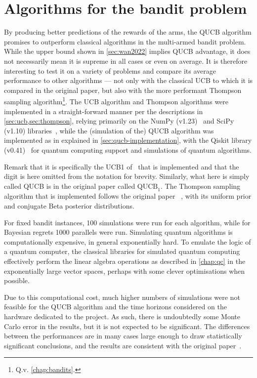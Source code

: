 \section{Algorithms for the bandit problem}
By producing better predictions of the rewards of the arms, the QUCB algorithm promises to outperform classical algorithms in the multi-armed bandit problem.
While the upper bound shown in \cref{sec:wan2022} implies QUCB advantage, it does not necessarily mean it is supreme in all cases or even on average.
It is therefore interesting to test it on a variety of problems and compare its average performance to other algorithms — not only with the classical UCB to which it is compared in the original paper, but also with the more performant Thompson sampling algorithm\footnote{Q.v. \cref{chap:bandits}.}.
The UCB algorithm and Thompson algorithms were implemented in a straight-forward manner per the descriptions in \cref{sec:ucb,sec:thompson}, relying primarily on the NumPy (v1.23)~\autocite{numpy} and SciPy (v1.10) libraries~\autocite{scipy}, while the (simulation of the) QUCB algorithm was implemented as in explained in \cref{sec:qucb-implementation}, with the Qiskit library (v0.41)~\autocite{qiskit} for quantum computing support and simulations of quantum algorithms.

Remark that it is specifically the UCB1 of~\autocite{auer2002} that is implemented and that the digit is here omitted from the notation for brevity.
Similarly, what here is simply called QUCB is in the original paper called $\text{QUCB}_1$.
The Thompson sampling algorithm that is implemented follows the original paper ~\autocite{thompson1933}, with its uniform prior and conjugate Beta posterior distributions.

For fixed bandit instances, 100 simulations were run for each algorithm, while for Bayesian regrets 1000 parallels were run.
Simulating quantum algorithms is computationally expensive, in general exponentially hard\footnotemark.
To emulate the logic of a quantum computer, the classical libraries for simulated quantum computing effectively perform the linear algebra operations as described in \cref{chap:qc} in the exponentially large vector spaces, perhaps with some clever optimisations when possible.

Due to this computational cost, much higher numbers of simulations were not feasible for the QUCB algorithm and the time horizons considered on the hardware dedicated to the project.
As such, there is undoubtedly some Monte Carlo error in the results, but it is not expected to be significant.
The differences between the performances are in many cases large enough to draw statistically significant conclusions, and the results are consistent with the original paper~\autocite{wan2022}.

